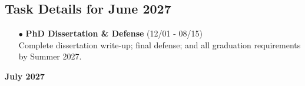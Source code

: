 \documentclass[landscape,a4paper]{article}
\begin{document}
\subsection{Task Details for June 2027}
\begin{itemize}[leftmargin=1cm]
    \item[\textcolor{other}{$\bullet$}] \textbf{PhD Dissertation \& Defense} (12/01 - 08/15)\\ Complete dissertation write-up; final defense; and all graduation requirements by Summer 2027.
\end{itemize}

\newpage
\pagestyle{empty}

\begin{center}
{\large\textbf{July 2027}}
\end{center}

\vspace{0.5cm}
\end{document}

